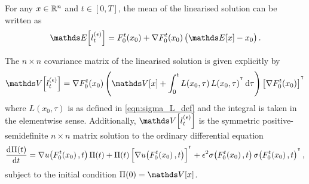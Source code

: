 \begin{corollary}\label{thm:limit_moments}
	For any \(x \in \mathbb{R}^n\) and \(t \in [0,T]\), the mean of the linearised solution can be written as
	\begin{equation}
		\avg{l_t^{(\epsilon)}} = F_0^t\!\left(x_0\right) + \nabla F_0^t\!\left(x_0\right) \left(\avg{x} - x_0\right).
		\label{eqn:mean_expl_eqn}
	\end{equation}

	The \(n\times n\) covariance matrix of the linearised solution is given explicitly by
	\begin{equation}
		\var{l_t^{(\epsilon)}} = \nabla F_0^t\!\left(x_0\right)\left(\var{x} + \int_0^t{L\!\left(x_0,\tau\right)L\!\left(x_0,\tau\right)^{\T}\dif\tau}\right)\left[\nabla F_0^t\!\left(x_0\right)\right]^{\T}
		\label{eqn:pi_expl_eqn}
	\end{equation}
	where \(L\!\left(x_0, \tau\right)\) is as defined in \eqref{eqn:sigma_L_def} and the integral is taken in the elementwise sense.
	Additionally, \(\var{l_t^{(\epsilon)}}\) is the symmetric positive-semidefinite \(n \times n\) matrix solution to the ordinary differential equation
	\begin{equation}
		\dod{\Pi(t)}{t} = \begin{multlined}[t]
			\nabla u\!\left(F_0^t\!\left(x_0\right), t\right) \Pi(t) + \Pi(t)\left[\nabla u\!\left(F_0^t\!\left(x_0\right), t\right)\right]^{\T} + \epsilon^2\sigma\!\left(F_0^t\!\left(x_0\right), t\right)\sigma\!\left(F_0^t\!\left(x_0\right), t\right)^{\T},
		\end{multlined}
		\label{eqn:pi_ode}
	\end{equation}
	subject to the initial condition \(\Pi(0) = \var{x}\).
\end{corollary}
